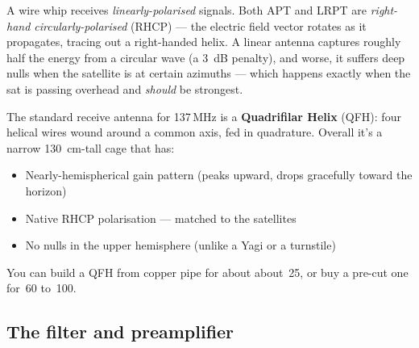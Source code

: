 \documentclass[11pt,a4paper]{article}
\newcommand{\EUR}[1]{\officialeuro\,#1}
\begin{document}
A wire whip receives \emph{linearly-polarised} signals.  Both APT
and LRPT are \emph{right-hand circularly-polarised} (RHCP) — the
electric field vector rotates as it propagates, tracing out a
right-handed helix.  A linear antenna captures roughly half the
energy from a circular wave (a \SI{3}{dB} penalty), and worse, it
suffers deep nulls when the satellite is at certain azimuths — which
happens exactly when the sat is passing overhead and \emph{should}
be strongest.

The standard receive antenna for 137\,MHz is a \textbf{Quadrifilar
Helix} (QFH): four helical wires wound around a common axis, fed in
quadrature.  Overall it's a narrow \SI{130}{cm}-tall cage that has:

\begin{itemize}
  \item Nearly-hemispherical gain pattern (peaks upward, drops
        gracefully toward the horizon)
  \item Native RHCP polarisation — matched to the satellites
  \item No nulls in the upper hemisphere (unlike a Yagi or a
        turnstile)
\end{itemize}

You can build a QFH from copper pipe for about about \EUR{25}, or
buy a pre-cut one for \EUR{60} to \EUR{100}.

\begin{center}
\end{center}

\subsection{The filter and preamplifier}
\end{document}
